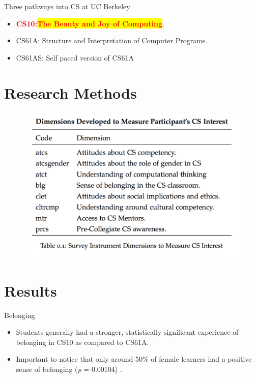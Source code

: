\documentclass{beamer}                  %
\newcommand{\hilight}[1]{\colorbox{yellow}{#1}}
\begin{document}
        \begin{frame}{}
        Three pathways into CS at UC Berkeley
            \begin{itemize}
                 \item \textcolor{red}{\textbf{CS10:\hilight{The Beauty and Joy of Computing}}}.
                 \item CS61A: Structure and Interpretation of Computer Programs.
                \item CS61AS: Self paced version of CS61A
            \end{itemize}
        \end{frame}


\section{Research Methods}
\begin{frame}{}

  \begin{figure}[!htbp]
      \centering
      
      \includegraphics[width=1\textwidth]{CSAttitudes}
      
        
  \end{figure}

\end{frame}

\section{Results}
\begin{frame}{Belonging}
\begin{itemize}
\item Students generally had a stronger, statistically significant experience of belonging in CS10 as compared to CS61A. 
\item Important to notice that only around 50\% of female learners had a positive sense of belonging (\emph{p} = 0.00104) . 
\end{itemize}
\end{frame}
\end{document}

